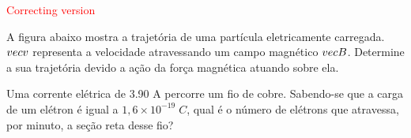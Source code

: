 \documentclass[12pt, addpoints]{exam}
\begin{document}
        \begin{center}
\textcolor{red}{\emph\Large Correcting version}\end{center}
\begin{questions}
\begin{multicols*}{2}
\question[20] A ﬁgura abaixo mostra a trajetória de uma partícula eletricamente carregada. $\\vec{{v}}$ representa a velocidade atravessando um campo magnético $\\vec{{B}}$. Determine a sua trajetória devido a ação da força magnética atuando sobre ela.
        
        \begin{center}
            \begin{minipage}[c]{0.5\linewidth}
            \end{minipage}
        \end{center}

        

\begin{oneparchoices}
\end{oneparchoices}
\question[20] Uma corrente elétrica de    3.90 A percorre um ﬁo de cobre. Sabendo-se que a carga de um elétron é igual a $1,6\times 10^{-19}\;C$, qual é o número de elétrons que atravessa, por minuto, a seção reta desse ﬁo?


\end{multicols*}
\end{questions}
\end{document}
